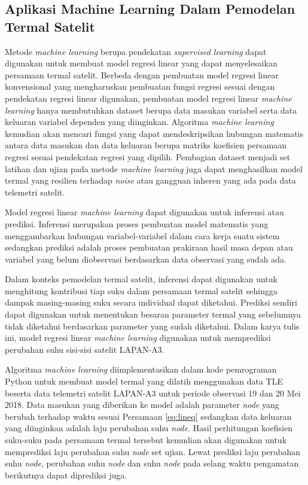 \subsection{Aplikasi Machine Learning Dalam Pemodelan Termal Satelit}

Metode \textit{machine learning} berupa pendekatan \textit{supervised learning}
dapat digunakan untuk membuat model regresi linear yang dapat menyelesaikan
persamaan termal satelit. Berbeda dengan pembuatan model regresi linear
konvensional yang mengharuskan pembuatan fungsi regresi sesuai dengan
pendekatan regresi linear digunakan, pembuatan model regresi linear
\textit{machine learning} hanya membutuhkan dataset berupa data masukan
variabel serta data keluaran variabel dependen yang diinginkan. Algoritma
\textit{machine learning} kemudian akan mencari fungsi yang dapat
mendeskripsikan hubungan matematis antara data masukan dan data keluaran berupa
matriks koefisien persamaan regresi sesuai pendekatan regresi yang dipilih.
Pembagian dataset menjadi set latihan dan ujian pada metode \textit{machine
learning} juga dapat menghasilkan model termal yang resilien terhadap
\textit{noise} atau gangguan inheren yang ada pada data telemetri satelit.

Model regresi linear \textit{machine learning} dapat digunakan untuk inferensi
atau prediksi. Inferensi merupakan proses pembuatan model matematis yang
menggambarkan hubungan variabel-variabel dalam cara kerja suatu sistem
sedangkan prediksi adalah proses pembuatan prakiraan hasil masa depan atau
variabel yang belum diobservasi berdasarkan data observasi yang sudah ada. 

Dalam konteks pemodelan termal satelit, inferensi dapat digunakan untuk
menghitung kontribusi tiap suku dalam persamaan termal satelit sehingga dampak
masing-masing suku secara individual dapat diketahui. Prediksi sendiri dapat
digunakan untuk menentukan besaran parameter termal yang sebelumnya tidak
diketahui berdasarkan parameter yang sudah diketahui. Dalam karya tulis ini,
model regresi linear \textit{machine learning} digunakan untuk memprediksi
perubahan suhu sisi-sisi satelit LAPAN-A3.

Algoritma \textit{machine learning} diimplementasikan dalam kode pemrograman
Python untuk membuat model termal yang dilatih menggunakan data TLE beserta
data telemetri satelit LAPAN-A3 untuk periode observasi 19 dan 20 Mei 2018.
Data masukan yang diberikan ke model adalah parameter \textit{node} yang
berubah terhadap waktu sesuai Persamaan \ref{eq:lineq} sedangkan data keluaran
yang diinginkan adalah laju perubahan suhu \textit{node}. Hasil perhitungan
koefisien suku-suku pada persamaan termal tersebut kemudian akan digunakan
untuk memprediksi laju perubahan suhu \textit{node} set ujian. Lewat prediksi
laju perubahan suhu \textit{node}, perubahan suhu \textit{node} dan suhu
\textit{node} pada selang waktu pengamatan berikutnya dapat diprediksi juga.

